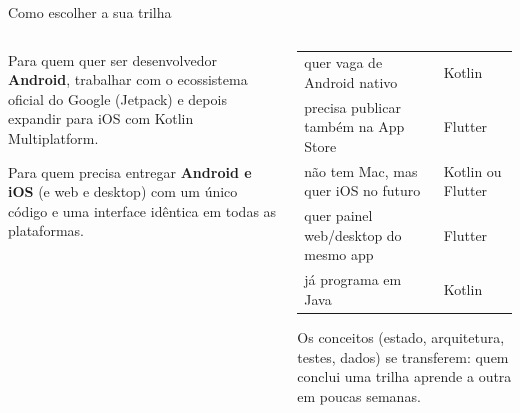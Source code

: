 \documentclass[aspectratio=169,10pt]{beamer}
\begin{document}
\begin{frame}{Como escolher a sua trilha}
  \begin{columns}[T]
    \begin{column}{0.48\textwidth}
      \begin{conceito}
        Para quem quer ser desenvolvedor \textbf{Android}, trabalhar com o ecossistema oficial do Google (Jetpack) e depois expandir para iOS com Kotlin Multiplatform.
      \end{conceito}
      \begin{conceito}
        Para quem precisa entregar \textbf{Android e iOS} (e web e desktop) com um único código e uma interface idêntica em todas as plataformas.
      \end{conceito}
    \end{column}
    \begin{column}{0.5\textwidth}
      \scriptsize
      \begin{tabularx}{\linewidth}{@{}L l@{}}
        \toprule
         &  \\
        \midrule
        quer vaga de Android nativo & Kotlin \\
        precisa publicar também na App Store & Flutter \\
        não tem Mac, mas quer iOS no futuro & Kotlin ou Flutter \\
        quer painel web/desktop do mesmo app & Flutter \\
        já programa em Java & Kotlin \\
        \bottomrule
      \end{tabularx}
      \begin{dica}
        Os conceitos (estado, arquitetura, testes, dados) se transferem: quem conclui uma trilha aprende a outra em poucas semanas.
      \end{dica}
    \end{column}
  \end{columns}
\end{frame}
\end{document}
